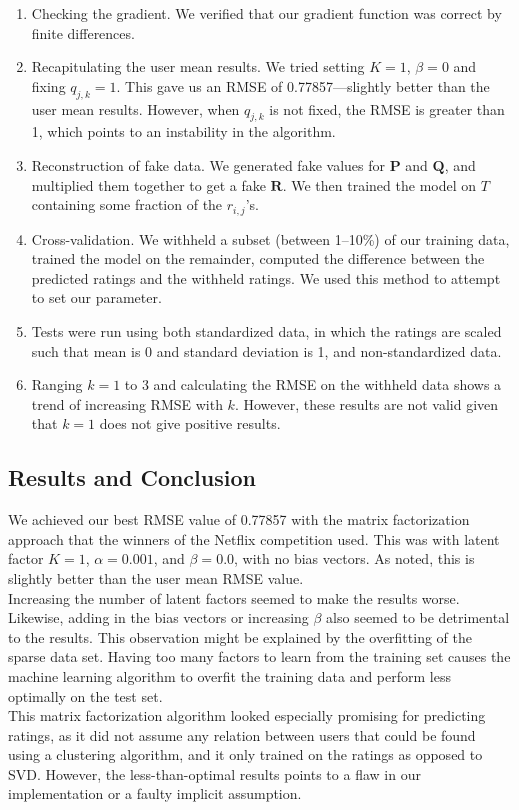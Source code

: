 \documentclass[11pt]{amsart}
\newcommand{\mat}[1]{\mathbf{#1}}
\begin{document}
\begin{enumerate}
\item Checking the gradient. We verified that our gradient function was correct by finite differences.
\item Recapitulating the user mean results. We tried setting $K=1$, $\beta=0$ and fixing $q_{j,k} = 1$. This gave us an RMSE of 0.77857---slightly better than the user mean results. However, when $q_{j,k}$ is not fixed, the RMSE is greater than 1, which points to an instability in the algorithm.
\item Reconstruction of fake data. We generated fake values for $\mat{P}$ and $\mat{Q}$, and multiplied them together to get a fake $\mat{R}$. We then trained the model on $T$ containing some fraction of the $r_{i,j}$'s.  
\item Cross-validation. We withheld a subset (between 1--10\%) of our training data, trained the model on the remainder, computed the difference between the predicted ratings and the withheld ratings. We used this method to attempt to set our parameter.
\item Tests were run using both standardized data, in which the ratings are scaled such that mean is 0 and standard deviation is 1, and non-standardized data.
\item Ranging $k=1$ to 3 and calculating the RMSE on the withheld data shows a trend of increasing RMSE with $k$. However, these results are not valid given that $k=1$ does not give positive results.
 
\end{enumerate}

\subsection{Results and Conclusion}
We achieved our best RMSE value of 0.77857 with the matrix factorization approach that the winners of the Netflix competition used. This was with latent factor $K = 1$, $\alpha = 0.001$, and $\beta = 0.0$, with no bias vectors. As noted, this is slightly better than the user mean RMSE value. \\

Increasing the number of latent factors seemed to make the results worse. Likewise, adding in the bias vectors or increasing $\beta$ also seemed to be detrimental to the results. This observation might be explained by the overfitting of the sparse data set. Having too many factors to learn from the training set causes the machine learning algorithm to overfit the training data and perform less optimally on the test set.\\

This matrix factorization algorithm looked especially promising for predicting ratings, as it did not assume any relation between users that could be found using a clustering algorithm, and it only trained on the ratings as opposed to SVD. However, the less-than-optimal results points to a flaw in our implementation or a faulty implicit assumption.



\end{document}
